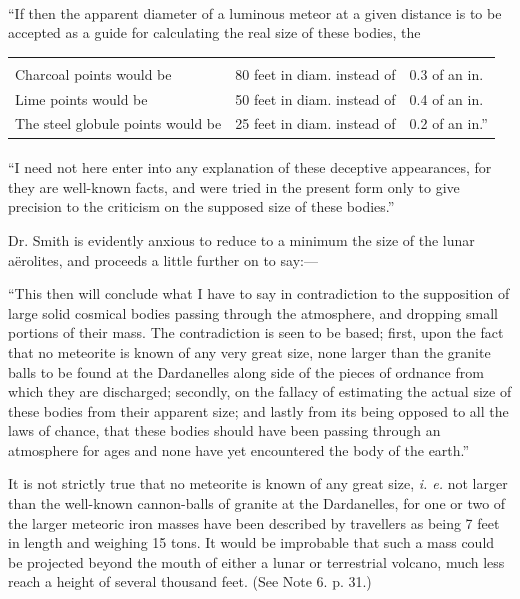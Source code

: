 \documentclass[a4paper, 12pt, oneside]{article}
\begin{document}
\paragraph{}
``If then the apparent diameter of a luminous meteor at a given distance is to be accepted as a guide for calculating the real size of these bodies, the
\begin{table}[H]
    \footnotesize
    \centering
    \bfseries
    \Fontauri
    \begin{tabular}{l l l}
         &  &  \\ 
        Charcoal points would be & 80 feet in diam. instead of & 0.3 of an in. \\
        Lime points would be & 50 feet in diam. instead of & 0.4 of an in. \\
        The steel globule points would be & 25 feet in diam. instead of & 0.2 of an in.'' \\
    \end{tabular}
\end{table}
\paragraph{}
``I need not here enter into any explanation of these deceptive appearances, for they are well-known facts, and were tried in the present form only to give precision to the criticism on the supposed size of these bodies.''

Dr. Smith is evidently anxious to reduce to a minimum the size of the lunar aërolites, and proceeds a little further on to say:---

``This then will conclude what I have to say in contradiction to the supposition of large solid cosmical bodies passing through the atmosphere, and dropping small portions of their mass. The contradiction is seen to be based; first, upon the fact that no meteorite is known of any very great size, none larger than the granite balls to be found at the Dardanelles along side of the pieces of ordnance from which they are discharged; secondly, on the fallacy of estimating the actual size of these bodies from their apparent size; and lastly from its being opposed to all the laws of chance, that these bodies should have been passing through an atmosphere for ages and none have yet encountered the body of the earth.''

It is not strictly true that no meteorite is known of any great size, \emph{i. e.} not larger than the well-known cannon-balls of granite at the Dardanelles, for one or two of the larger meteoric iron masses have been described by travellers as being 7 feet in length and weighing 15 tons. It would be improbable that such a mass could be projected beyond the mouth of either a lunar or terrestrial volcano, much less reach a height of several thousand feet. (See Note 6. p. 31.)
\end{document}
